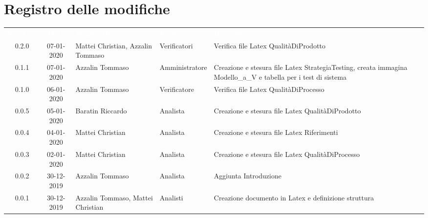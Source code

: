 \section*{Registro delle modifiche}
{
\renewcommand{\arraystretch}{1.5}
\centering
\begin{longtable}{ c c  C{4cm}  C{3cm} C{4cm}}
\textcolor{white}{\textbf{Versione}} & \textcolor{white}{\textbf{Data}} & \textcolor{white}{\textbf{Nominativo}} & \textcolor{white}{\textbf{Ruolo}} & \textcolor{white}{\textbf{Descrizione}}\\	

0.2.0 & 07-01-2020 & Mattei Christian, Azzalin Tommaso & Verificatori & Verifica file Latex QualitàDiProdotto \\
0.1.1 & 07-01-2020 & Azzalin Tommaso & Amministratore & Creazione e stesura file Latex StrategiaTesting, creata immagina Modello_a_V e tabella per i test di sistema \\
0.1.0 & 06-01-2020 & Azzalin Tommaso & Verificatore & Verifica file Latex QualitàDiProcesso \\
0.0.5 & 05-01-2020 & Baratin Riccardo & Analista & Creazione e stesura file Latex QualitàDiProdotto \\
0.0.4 & 04-01-2020 & Mattei Christian & Analista & Creazione e stesura file Latex Riferimenti \\
0.0.3 & 02-01-2020 & Mattei Christian & Analista & Creazione e stesura file Latex QualitàDiProcesso \\
0.0.2 & 30-12-2019 & Azzalin Tommaso & Analista & Aggiunta Introduzione \\
0.0.1 & 30-12-2019 & Azzalin Tommaso, Mattei Christian & Analisti & Creazione documento in Latex e definizione struttura \\	
		
\end{longtable}
}

